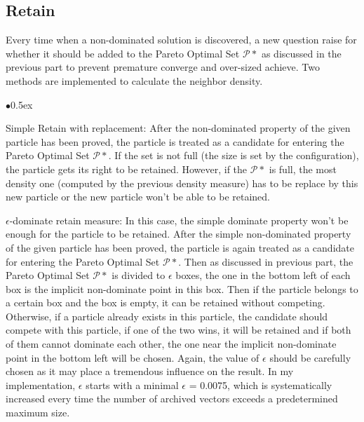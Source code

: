 \documentclass[12pt, runningheads,a4paper]{llncs}
\begin{document}
\subsection{Retain}
Every time when a non-dominated solution is discovered, a new question raise for whether it should be added to the Pareto Optimal Set $\mathcal{P}*$ as discussed in the previous part to prevent premature converge and over-sized achieve. Two methods are implemented to calculate the neighbor density. 
\begin{list}{$\bullet$}{\itemsep 0.5ex}
\item Simple Retain with replacement: After the non-dominated property of the given particle has been proved, the particle is treated as a candidate for entering the Pareto Optimal Set $\mathcal{P}*$. If the set is not full (the size is set by the configuration), the particle gets its right to be retained. However, if the $\mathcal{P}*$ is full, the most density one (computed by the previous density measure) has to be replace by this new particle or the new particle won't be able to be retained.
\item $\epsilon$-dominate retain measure: In this case, the simple dominate property won't be enough for the particle to be retained. After the simple non-dominated property of the given particle has been proved, the particle is again treated as a candidate for entering the Pareto Optimal Set $\mathcal{P}*$. Then as discussed in previous part, the Pareto Optimal Set $\mathcal{P}*$ is divided to $\epsilon$ boxes, the one in the bottom left of each box is the implicit non-dominate point in this box. Then if the particle belongs to a certain box and the box is empty, it can be retained without competing. Otherwise, if a particle already exists in this particle, the candidate should compete with this particle, if one of the two wins, it will be retained and if both of them cannot dominate each other, the one near the implicit non-dominate point in the bottom left will be chosen. Again, the value of $\epsilon$ should be carefully chosen as it may place a tremendous influence on the result. In my implementation, $\epsilon$ starts with a minimal $\epsilon$ = 0.0075, which is systematically increased every time the number of archived vectors exceeds a predetermined maximum size. 
\end{list}
\end{document}
